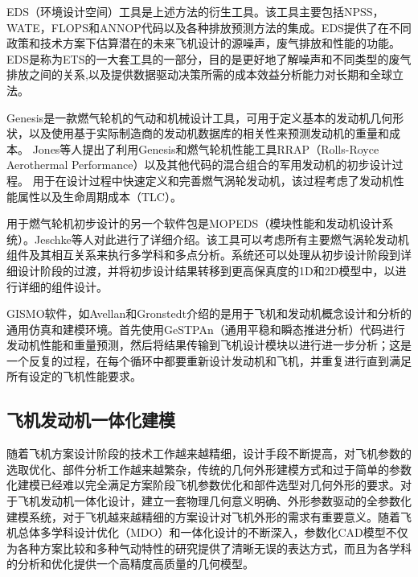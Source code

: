 \documentclass[12pt,a4paper]{report}
\begin{document}
EDS（环境设计空间）工具是上述方法的衍生工具。该工具主要包括NPSS，WATE，FLOPS和ANNOP代码以及各种排放预测方法的集成。EDS提供了在不同政策和技术方案下估算潜在的未来飞机设计的源噪声，废气排放和性能的功能。EDS是称为ETS的一大套工具的一部分，目的是更好地了解噪声和不同类型的废气排放之间的关系,以及提供数据驱动决策所需的成本效益分析能力对长期和全球立法。

Genesis是一款燃气轮机的气动和机械设计工具，可用于定义基本的发动机几何形状，以及使用基于实际制造商的发动机数据库的相关性来预测发动机的重量和成本。 Jones等人\cite{jones2003a}提出了利用Genesis和燃气轮机性能工具RRAP（Rolls-Royce Aerothermal Performance）以及其他代码的混合组合的军用发动机的初步设计过程。 用于在设计过程中快速定义和完善燃气涡轮发动机，该过程考虑了发动机性能属性以及生命周期成本（TLC）。

用于燃气轮机初步设计的另一个软件包是MOPEDS（模块性能和发动机设计系统）。Jeschke等人\cite{jeschke2004preliminary}对此进行了详细介绍。该工具可以考虑所有主要燃气涡轮发动机组件及其相互关系来执行多学科和多点分析。系统还可以处理从初步设计阶段到详细设计阶段的过渡，并将初步设计结果转移到更高保真度的1D和2D模型中，以进行详细的组件设计。

GISMO软件，如Avellan和Gronstedt\cite{avellán2007preliminary}介绍的是用于飞机和发动机概念设计和分析的通用仿真和建模环境。首先使用GeSTPAn（通用平稳和瞬态推进分析）代码进行发动机性能和重量预测，然后将结果传输到飞机设计模块以进行进一步分析；这是一个反复的过程，在每个循环中都要重新设计发动机和飞机，并重复进行直到满足所有设定的飞机性能要求。

\subsection{飞机发动机一体化建模}

随着飞机方案设计阶段的技术工作越来越精细，设计手段不断提高，对飞机参数的选取优化、部件分析工作越来越繁杂，传统的几何外形建模方式和过于简单的参数化建模已经难以完全满足方案阶段飞机参数优化和部件选型对几何外形的要求。对于飞机发动机一体化设计，建立一套物理几何意义明确、外形参数驱动的全参数化建模系统，对于飞机越来越精细的方案设计对飞机外形的需求有重要意义。随着飞机总体多学科设计优化（MDO）和一体化设计的不断深入，参数化CAD模型不仅为各种方案比较和多种气动特性的研究提供了清晰无误的表达方式，而且为各学科的分析和优化提供一个高精度高质量的几何模型。
\end{document}
